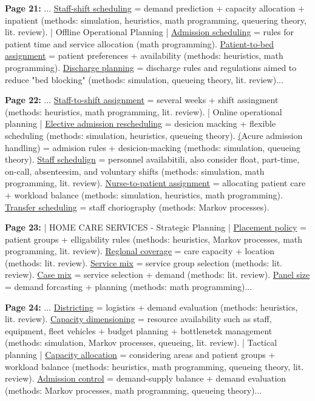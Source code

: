     \textbf{Page 21:}
    ... \underline{Staff-shift scheduling} = demand prediction + capacity allocation + inpatient (methods: simulation, heuristics, math programming, queuering theory, lit. review). | Offline Operational Planning | \underline{Admission scheduling} = rules for patient time and service allocation (math programming). \underline{Patient-to-bed assignment} = patient preferences + availability (methods: heuristics, math programming). \underline{Discharge planning} = discharge rules and regulations aimed to reduce "bed blocking" (methods: simulation, queueing theory, lit. review)...
    
    \textbf{Page 22:}
    ... \underline{Staff-to-shift assignment} = several weeks + shift assingment (methods: heuristics, math programming, lit. review). | Online operational planning | \underline{Elective admission rescheduling} = desicion macking + flexible scheduling (methods: simulation, heuristics, queueing theory). \underline (Acure admission handling) = admision rules + desicion-macking (methods: simulation, queueing theory). \underline{Staff schedulign} = personnel availabitili, also consider float, part-time, on-call, absenteesim, and voluntary shifts (methods: simulation, math programming, lit. review). \underline{Nurse-to-patient assignment} = allocating patient care + workload balance (methods: simulation, heuristics, math programming). \underline{Transfer scheduling} = staff choriography (methods: Markov processes). 
    
    \textbf{Page 23:}
    | HOME CARE SERVICES - Strategic Planning | \underline{Placement policy} = patient groups + elligability rules (methods: heuristics, Markov processes, math programming, lit. review). \underline{Reglonal coverage} = care capacity + location (methods: lit. review). \underline{Service mix} = service group selection (methods: lit. review). \underline{Case mix} = service selection + demand (methods: lit. review). \underline{Panel size} = demand forcasting + planning (methods: math programming)... 
    
    \textbf{Page 24:}
    ... \underline{Districting} = logistics + demand evaluation (methods: heuristics, lit. review). \underline{Capacity dimensioning} = resource availability such as staff, equipment, fleet vehicles + budget planning + bottlenetck management (methods: simulation, Markov processes, queueing, lit. review). | Tactical planning | \underline{Capacity allocation} = considering areas and patient groups + workload balance (methods: heuristics, math programming, queueing theory, lit. review). \underline{Admission control} = demand-supply balance + demand evaluation (methods: Markov processes, math programming, queueing theory)... 
    

